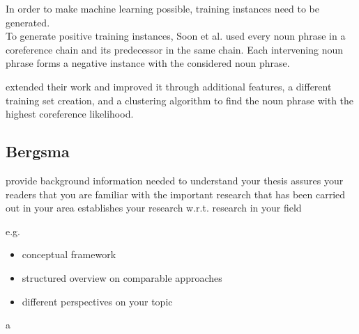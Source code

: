 In order to make machine learning possible, training instances need to be generated.\\
To generate positive training instances, Soon et al. used every noun phrase in a coreference chain and its predecessor in the same chain. Each intervening noun phrase forms a negative instance with the considered noun phrase. 


\citep{ng2002improving} extended their work and improved it through additional features, a different training set creation, and a clustering algorithm to find the noun phrase with the highest coreference likelihood. 

\subsection{Bergsma}


provide background information needed to understand your thesis
assures your readers that you are familiar with the important research that has been carried out in your area
establishes your research w.r.t. research in your field

e.g.\
\begin{itemize}
  \item conceptual framework
  \item structured overview on comparable approaches
  \item different perspectives on your topic
\end{itemize}

 a